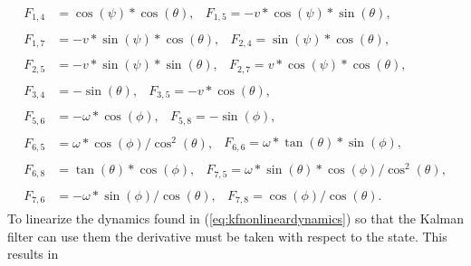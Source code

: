 \begin{align*}
\begin{split}
F_{1,4} &= \cos(\psi)*\cos(\theta),
\end{split}
\begin{split}
F_{1,5} = -v*\cos(\psi)*\sin(\theta),
\end{split} \\
\begin{split}
F_{1,7} &= -v*\sin(\psi)*\cos(\theta),
\end{split}
\begin{split}
F_{2,4} = \sin(\psi)*\cos(\theta),
\end{split} \\
\begin{split}
F_{2,5} &= -v*\sin(\psi)*\sin(\theta),
\end{split}
\begin{split}
F_{2,7} = v*\cos(\psi)*\cos(\theta),
\end{split} \\
\begin{split}
F_{3,4} &= -\sin(\theta),
\end{split}
\begin{split}
F_{3,5} = -v*\cos(\theta),
\end{split} \\
\begin{split}
F_{5,6} &= -\omega *\cos(\phi),
\end{split}
\begin{split}
F_{5,8} = -\sin(\phi),
\end{split} \\
\begin{split}
F_{6,5} &= \omega *\cos(\phi)/\cos^2(\theta),
\end{split}
\begin{split}
F_{6,6} = \omega *\tan(\theta)*\sin(\phi),
\end{split} \\
\begin{split}
F_{6,8} &= \tan(\theta)*\cos(\phi),
\end{split}
\begin{split}
F_{7,5} = \omega *\sin(\theta)*\cos(\phi)/\cos^2(\theta),
\end{split} \\
\begin{split}
F_{7,6} &= -\omega *\sin(\phi)/\cos(\theta),
\end{split}
\begin{split}
F_{7,8} = \cos(\phi)/\cos(\theta).
\end{split}
\end{align*}
To linearize the dynamics found in (\ref{eq:kfnonlineardynamics}) so that the Kalman filter can use them the derivative must be taken with respect to the state. This results in

